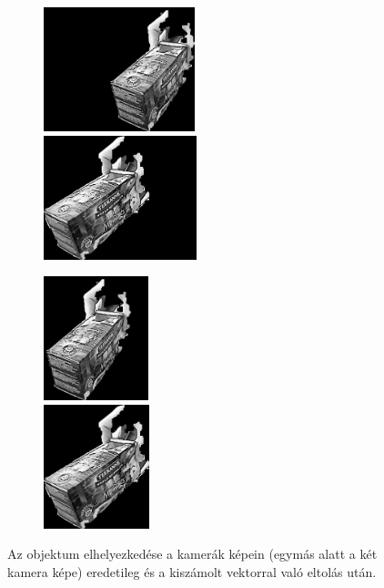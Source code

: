 \begin{figure}[tbh]
\centering
\begin{subfigure}[b]{.49\linewidth}
	\centering
	\includegraphics[height=102pt]{figures/before_shift_top.png}\\\vspace{3pt}
	\includegraphics[height=102pt]{figures/before_shift_bottom.png}
  \end{subfigure}
\begin{subfigure}[b]{.49\linewidth}
	\centering
	\includegraphics[height=102pt]{figures/after_shift_top.png}\\\vspace{3pt}
	\includegraphics[height=102pt]{figures/after_shift_bottom.png}
  \end{subfigure}
\caption{Az objektum elhelyezkedése a kamerák képein (egymás alatt a két kamera képe) eredetileg és a kiszámolt vektorral való eltolás után. \label{fig:shifted}}
\end{figure}

